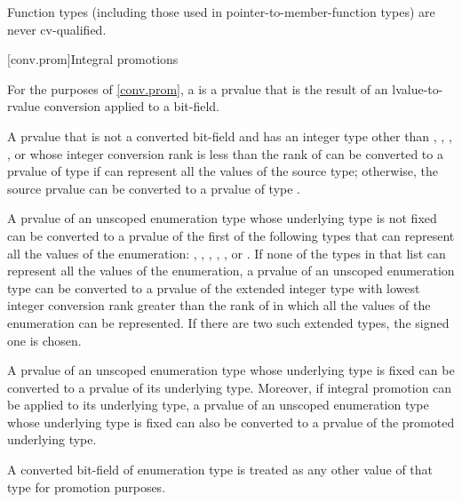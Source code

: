 \pnum
\begin{note}
Function types (including those used in pointer-to-member-function types)
are never cv-qualified.
\end{note}

[conv.prom]{Integral promotions}

\pnum
For the purposes of \ref{conv.prom},
a  is a prvalue that is the result of
an lvalue-to-rvalue conversion applied to
a bit-field.

\pnum
{}%
A prvalue that is not a converted bit-field and has an integer type other than
, , ,
, or  whose integer conversion
rank is less than the rank of  can be
converted to a prvalue of type  if  can represent
all the values of the source type; otherwise, the source prvalue can be
converted to a prvalue of type .

\pnum
{}%
A prvalue of an unscoped enumeration type whose underlying type is not
fixed can be converted to a prvalue of the first of the following
types that can represent all the values of the enumeration: ,
, , ,
, or . If none of the types in that
list can represent all the values of the enumeration, a prvalue of an unscoped
enumeration type can be converted to a prvalue of the extended integer type with lowest
integer conversion rank greater than the rank of 
in which all the values of the enumeration can be represented. If there are
two such extended types, the signed one is chosen.

\pnum
A prvalue of an unscoped enumeration type whose underlying type is
fixed can be converted to a prvalue of its underlying type. Moreover,
if integral promotion can be applied to its underlying type, a prvalue of an unscoped
enumeration type whose underlying type is fixed can also be converted to a prvalue of
the promoted underlying type.
\begin{note}
A converted bit-field of enumeration type is treated as
any other value of that type for promotion purposes.
\end{note}

